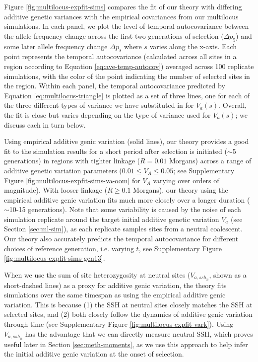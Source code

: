 \documentclass[11pt]{article}
\begin{document}
Figure \ref{fig:multilocus-expfit-sims} compares the fit of our theory with
differing additive genetic variances with the empirical
covariances from our multilocus simulations. In each panel, we plot the level
of temporal autocovariance between the allele frequency change across the first
two generations of selection ($\Delta p_5$) and some later allele frequency
change $\Delta p_s$ where $s$ varies along the x-axis. Each point represents
the temporal autocovariance (calculated across all sites in a region according
to Equation \ref{eq:ave-temp-autocov}) averaged across 100 replicate
simulations, with the color of the point indicating the number of selected
sites in the region. Within each panel, the temporal autocovariance predicted
by Equation \eqref{eq:multilocus-triangle} is plotted as a set of three
lines, one for each of the three different types of variance we have
substituted in for $V_a(s)$. Overall, the fit is close but varies depending on
the type of variance used for $V_a(s)$; we discuss each in turn below.

Using empirical additive genic variation (solid lines), our theory provides a
good fit to the simulation results for a short period after selection is
initiated ($\sim$5 generations) in regions with tighter linkage ($R=0.01$
Morgans) across a range of additive genetic variation parameters ($0.01 \le V_A
\le 0.05$; see Supplementary Figure \ref{fig:multilocus-expfit-sims-va-oom} for
$V_A$ varying over orders of magnitude). With looser linkage ($R \ge 0.1$
Morgans), our theory using the empirical additive genic variation fits much
more closely over a longer duration ($\sim$10-15 generations). Note that some
variability is caused by the noise of each simulation replicate around the
target initial additive genetic variation $V_a$ (see Section \ref{sec:ml-sim}),
as each replicate samples sites from a neutral coalescent.  Our theory also
accurately predicts the temporal autocovariance for different choices of
reference generation, i.e.  varying $t$, see Supplementary Figure
\ref{fig:multilocus-expfit-sims-gen13}.

When we use the sum of site heterozygosity at neutral sites ($V_{a,ssh_n}$,
shown as a short-dashed lines) as a proxy for additive genic variation, the
theory fits simulations over the same timespan as using the empirical additive
genic variation. This is because (1) the SSH at neutral sites closely matches
the SSH at selected sites, and (2) both closely follow the dynamics of additive
genic variation through time (see Supplementary Figure
\ref{fig:multilocus-expfit-vark}). Using $V_{a,ssh_n}$ has the advantage that
we can directly measure neutral SSH, which proves useful later in Section
\ref{sec:meth-moments}, as we use this approach to help infer the initial
additive genic variation at the onset of selection.
\end{document}
